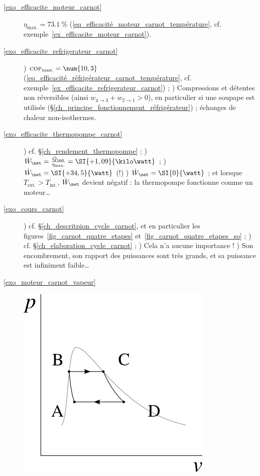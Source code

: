 \exercisesolutionpage
\titreresultats

	\begin{description}
		\item [\ref{exo_efficacite_moteur_carnot}]
					\tab $\eta_\text{max.} = \SI{73,1}{\percent}$ (\ref{eq_efficacité_moteur_carnot_température}, cf. exemple~\ref{ex_efficacite_moteur_carnot}).
		\item [\ref{exo_efficacite_refrigerateur_carnot}]
					) $\textsc{cop}_\text{max.} = \num{10,3}$ (\ref{eq_efficacité_réfrigérateur_carnot_température}, cf. exemple~\ref{ex_efficacite_refrigerateur_carnot}) ;
					) Compressions et détentes non réversibles (ainsi $w_{4\to 3} + w_{2\to 1} > 0$), en particulier si une soupape est utilisée (\S\ref{ch_principe_fonctionnement_réfrigérateur}) ; échanges de chaleur non-isothermes.
		\item [\ref{exo_efficacite_thermopompe_carnot}]
					) cf. \S\ref{ch_rendement_thermopompe}	;
					) $\dot W_\net = \frac{\dot Q_\out}{\eta_\text{max.}} = \SI{+1,09}{\kilo\watt}$ ;
					) $\dot W_\net = \SI{+34,5}{\watt}$ (!)
					) $\dot W_\net = \SI{0}{\watt}$ ; et lorsque $T_\text{ext.} > T_\text{int.}$, $\dot W_\net$ devient négatif : la thermopompe fonctionne comme un moteur…
		\item [\ref{exo_cours_carnot}]
					) cf. \S\ref{ch_descritpion_cycle_carnot}, et en particulier les figures~\ref{fig_carnot_quatre_etapes} et~\ref{fig_carnot_quatre_etapes_so} ;
					) cf. \S\ref{ch_elaboration_cycle_carnot} ;
					) Cela n’a aucune importance !
					) Son encombrement, son rapport des puissances sont très grands, et sa puissance est infiniment faible…
		\item [\ref{exo_moteur_carnot_vapeur}]
					\includegraphics[width=\solutiondiagramwidth]{images/exo_sol_pv_carnot_lv_1.png}

\end{description}
